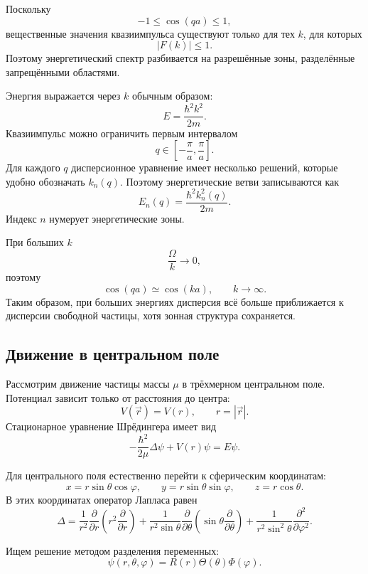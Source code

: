 \documentclass[12pt,a4paper]{article}
\begin{document}
Поскольку
\[
    -1\leq \cos(qa)\leq1,
\]
вещественные значения квазиимпульса существуют только для тех $k$,
для которых
\[
    \boxed{|F(k)|\leq1}.
\]
Поэтому энергетический спектр разбивается на разрешённые зоны,
разделённые запрещёнными областями.

Энергия выражается через $k$ обычным образом:
\[
    \boxed{
        E=\frac{\hbar^2k^2}{2m}
    }.
\]
Квазиимпульс можно ограничить первым интервалом
\[
    \boxed{
        q\in
        \left[
            -\frac{\pi}{a},
            \frac{\pi}{a}
        \right]
    }.
\]
Для каждого $q$ дисперсионное уравнение имеет несколько решений,
которые удобно обозначать $k_n(q)$. Поэтому энергетические ветви
записываются как
\[
    E_n(q)
    =
    \frac{\hbar^2k_n^2(q)}{2m}.
\]
Индекс $n$ нумерует энергетические зоны.

При больших $k$
\[
    \frac{\Omega}{k}\longrightarrow0,
\]
поэтому
\[
    \boxed{
        \cos(qa)\simeq\cos(ka),
        \qquad k\to\infty
    }.
\]
Таким образом, при больших энергиях дисперсия всё больше приближается
к дисперсии свободной частицы, хотя зонная структура сохраняется.


\subsection{Движение в центральном поле}

Рассмотрим движение частицы массы $\mu$ в трёхмерном центральном поле.
Потенциал зависит только от расстояния до центра:
\[
    V(\vec r)=V(r),
    \qquad
    r=|\vec r|.
\]
Стационарное уравнение Шрёдингера имеет вид
\[
    \boxed{
        -\frac{\hbar^2}{2\mu}\Delta\psi
        +V(r)\psi
        =
        E\psi
    }.
\]

Для центрального поля естественно перейти к сферическим координатам:
\[
    x=r\sin\theta\cos\varphi,
    \qquad
    y=r\sin\theta\sin\varphi,
    \qquad
    z=r\cos\theta.
\]
В этих координатах оператор Лапласа равен
\[
    \Delta
    =
    \frac{1}{r^2}
    \frac{\partial}{\partial r}
    \left(
        r^2\frac{\partial}{\partial r}
    \right)
    +
    \frac{1}{r^2\sin\theta}
    \frac{\partial}{\partial\theta}
    \left(
        \sin\theta
        \frac{\partial}{\partial\theta}
    \right)
    +
    \frac{1}{r^2\sin^2\theta}
    \frac{\partial^2}{\partial\varphi^2}.
\]

Ищем решение методом разделения переменных:
\[
    \boxed{
        \psi(r,\theta,\varphi)
        =
        R(r)\Theta(\theta)\Phi(\varphi)
    }.
\]
\end{document}
